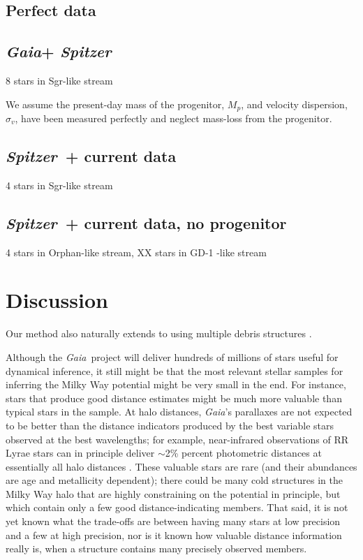 \documentclass[letterpaper,12pt,preprint]{aastex}
\newcommand{\project}[1]{\textsl{#1}}
\newcommand{\gaia}{\project{Gaia}}
\newcommand{\spitzer}{\project{Spitzer}~}
\begin{document}
\subsection{Perfect data}

\subsection{\gaia + \spitzer}
8 stars in Sgr-like stream

We assume the present-day mass of the progenitor, $M_p$, and velocity dispersion, $\sigma_v$, have been measured perfectly and neglect mass-loss from the progenitor. 

\subsection{\spitzer + current data}
4 stars in Sgr-like stream

\subsection{\spitzer + current data, no progenitor}
4 stars in Orphan-like stream, XX stars in GD-1 -like stream

\section{Discussion}

Our method also naturally extends to using multiple debris structures \citep[see][who illustrate the power of using multiple streams to simultaneously constrain the potential]{deg14}.

Although the \gaia\, project will deliver hundreds of millions of stars useful for dynamical inference,
  it still might be that the most relevant stellar samples for inferring the Milky Way potential might be very small in the end.
For instance, stars that produce good distance estimates might be much more valuable than typical stars in the sample.
At halo distances, \gaia's parallaxes are not expected to be better than the distance indicators produced by the best
  variable stars observed at the best wavelengths; for example, near-infrared observations of RR Lyrae stars
  can in principle deliver $\sim$2\% percent photometric distances at essentially all halo distances \citep{madore12}.
These valuable stars are rare (and their abundances are age and metallicity dependent);
  there could be many cold structures in the Milky Way halo that are highly constraining
  on the potential in principle, but which contain only a few good distance-indicating members.
That said, it is not yet known what the trade-offs are between having many stars at low precision and a few at high precision,
  nor is it known how valuable distance information really is, when a structure contains many precisely observed members.
\end{document}
